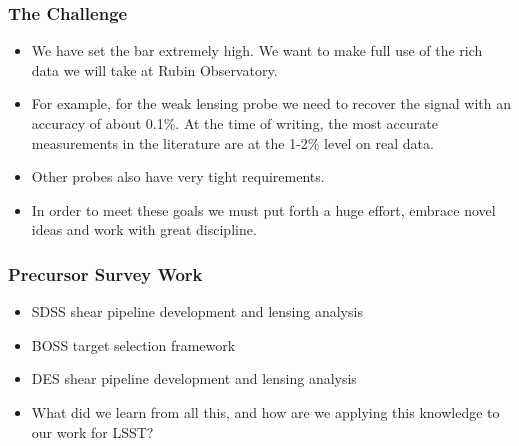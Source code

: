 \documentclass{beamer}
\begin{document}
\frame
{
    \frametitle{The Challenge}


    \begin{itemize}

        \item We have set the bar extremely high.  We want to make full use of the
            rich data we will take at Rubin Observatory.

        \item For example, for the weak lensing probe we need to recover the
            signal with an accuracy of about 0.1\%.  At the time of writing,
            the most accurate measurements in the literature are at the 1-2\%
            level on real data.

        \item Other probes also have very tight requirements.

        \item In order to meet these goals we must put forth a huge effort,
            embrace novel ideas and work with great discipline.

    \end{itemize}

}

\frame
{
    \frametitle{Precursor Survey Work}

    \begin{itemize}

        \item SDSS shear pipeline development and lensing analysis

        \item BOSS target selection framework

        \item DES shear pipeline development and lensing analysis

        \item What did we learn from all this, and how are we applying this
            knowledge to our work for LSST?

    \end{itemize}

}
\end{document}
